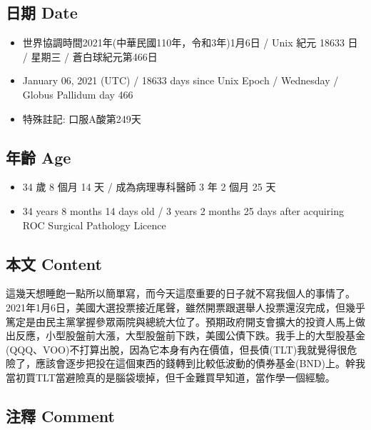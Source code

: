 \documentclass[a5paper, 11pt
]{book}
\providecommand{\tightlist}{%
  \setlength{\itemsep}{0pt}\setlength{\parskip}{0pt}}
\begin{document}
\hypertarget{ux65e5ux671f-date-36}{%
\subsection{日期 Date}\label{ux65e5ux671f-date-36}}

\begin{itemize}
\tightlist
\item
  世界協調時間2021年(中華民國110年，令和3年)1月6日 / Unix 紀元 18633 日
  / 星期三 / 蒼白球紀元第466日
\item
  January 06, 2021 (UTC) / 18633 days since Unix Epoch / Wednesday /
  Globus Pallidum day 466
\item
  特殊註記: 口服A酸第249天
\end{itemize}

\hypertarget{ux5e74ux9f61-age-36}{%
\subsection{年齡 Age}\label{ux5e74ux9f61-age-36}}

\begin{itemize}
\tightlist
\item
  34 歲 8 個月 14 天 / 成為病理專科醫師 3 年 2 個月 25 天
\item
  34 years 8 months 14 days old / 3 years 2 months 25 days after
  acquiring ROC Surgical Pathology Licence
\end{itemize}

\hypertarget{ux672cux6587-content-36}{%
\subsection{本文 Content}\label{ux672cux6587-content-36}}

這幾天想睡飽一點所以簡單寫，而今天這麼重要的日子就不寫我個人的事情了。2021年1月6日，美國大選投票接近尾聲，雖然開票跟選舉人投票還沒完成，但幾乎篤定是由民主黨掌握參眾兩院與總統大位了。預期政府開支會擴大的投資人馬上做出反應，小型股盤前大漲，大型股盤前下跌，美國公債下跌。我手上的大型股基金(QQQ、VOO)不打算出脫，因為它本身有內在價值，但長債(TLT)我就覺得很危險了，應該會逐步把投在這個東西的錢轉到比較低波動的債券基金(BND)上。幹我當初買TLT當避險真的是腦袋壞掉，但千金難買早知道，當作學一個經驗。

\hypertarget{ux6ce8ux91cb-comment-36}{%
\subsection{注釋 Comment}\label{ux6ce8ux91cb-comment-36}}
\end{document}
